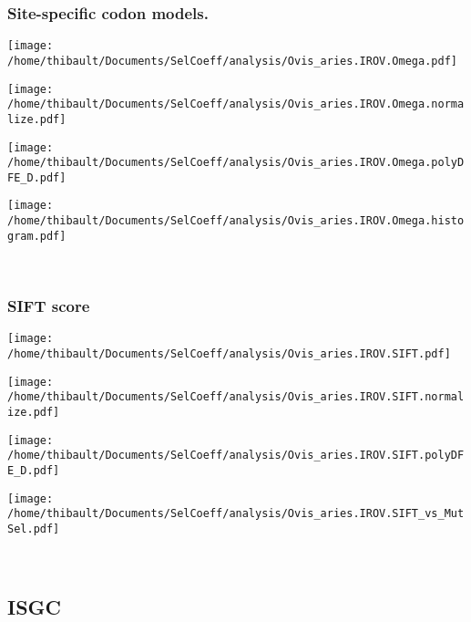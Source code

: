 \subsubsection*{Site-specific codon models.} 
\begin{minipage}{0.49\linewidth} 
\texttt{[image: /home/thibault/Documents/SelCoeff/analysis/Ovis\_aries.IROV.Omega.pdf]} 
\end{minipage}
\begin{minipage}{0.49\linewidth} 
\texttt{[image: /home/thibault/Documents/SelCoeff/analysis/Ovis\_aries.IROV.Omega.normalize.pdf]} 
\end{minipage}
\begin{minipage}{0.49\linewidth} 
\texttt{[image: /home/thibault/Documents/SelCoeff/analysis/Ovis\_aries.IROV.Omega.polyDFE\_D.pdf]} 
\end{minipage}
\begin{minipage}{0.49\linewidth} 
\texttt{[image: /home/thibault/Documents/SelCoeff/analysis/Ovis\_aries.IROV.Omega.histogram.pdf]} 
\end{minipage}
\\ 
\subsubsection*{SIFT score} 
\begin{minipage}{0.49\linewidth} 
\texttt{[image: /home/thibault/Documents/SelCoeff/analysis/Ovis\_aries.IROV.SIFT.pdf]} 
\end{minipage}
\begin{minipage}{0.49\linewidth} 
\texttt{[image: /home/thibault/Documents/SelCoeff/analysis/Ovis\_aries.IROV.SIFT.normalize.pdf]} 
\end{minipage}
\begin{minipage}{0.49\linewidth} 
\texttt{[image: /home/thibault/Documents/SelCoeff/analysis/Ovis\_aries.IROV.SIFT.polyDFE\_D.pdf]} 
\end{minipage}
\begin{minipage}{0.49\linewidth} 
\texttt{[image: /home/thibault/Documents/SelCoeff/analysis/Ovis\_aries.IROV.SIFT\_vs\_MutSel.pdf]} 
\end{minipage}
\\ 
\subsection{ISGC} 
 
